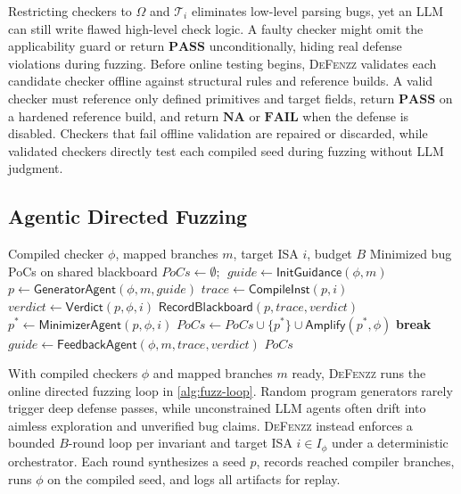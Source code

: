 \documentclass[conference,compsoc]{IEEEtran}
\begin{document}
Restricting checkers to $\Omega$ and $\mathcal{T}_i$ eliminates low-level parsing bugs, yet an LLM can still write flawed high-level check logic. A faulty checker might omit the applicability guard or return $\mathbf{PASS}$ unconditionally, hiding real defense violations during fuzzing. Before online testing begins, \textsc{DeFenzz} validates each candidate checker offline against structural rules and reference builds. A valid checker must reference only defined primitives and target fields, return $\mathbf{PASS}$ on a hardened reference build, and return $\mathbf{NA}$ or $\mathbf{FAIL}$ when the defense is disabled. Checkers that fail offline validation are repaired or discarded, while validated checkers directly test each compiled seed during fuzzing without LLM judgment.

\subsection{Agentic Directed Fuzzing}\label{sec:online}\label{sec:loop}

\begin{algorithm}[t]
\caption{Agentic Directed Fuzzing per Invariant}
\label{alg:fuzz-loop}
\footnotesize
\begin{algorithmic}[1]
\REQUIRE Compiled checker $\phi$, mapped branches $m$, target ISA $i$, budget $B$
\ENSURE Minimized bug PoCs on shared blackboard
\STATE $\textit{PoCs} \leftarrow \emptyset$; $\; \textit{guide} \leftarrow \mathsf{InitGuidance}(\phi, m)$
  \STATE $p \leftarrow \mathsf{GeneratorAgent}(\phi, m, \textit{guide})$
  \STATE $\textit{trace} \leftarrow \mathsf{CompileInst}(p, i)$
  \STATE $\textit{verdict} \leftarrow \mathsf{Verdict}(p, \phi, i)$
  \STATE $\mathsf{RecordBlackboard}(p, \textit{trace}, \textit{verdict})$
    \STATE $p^* \leftarrow \mathsf{MinimizerAgent}(p, \phi, i)$
    \STATE $\textit{PoCs} \leftarrow \textit{PoCs} \cup \{p^*\} \cup \mathsf{Amplify}(p^*, \phi)$
    \STATE \textbf{break}
  \ELSE
    \STATE $\textit{guide} \leftarrow \mathsf{FeedbackAgent}(\phi, m, \textit{trace}, \textit{verdict})$
  \ENDIF
\ENDFOR
\RETURN $\textit{PoCs}$
\end{algorithmic}
\end{algorithm}

With compiled checkers $\phi$ and mapped branches $m$ ready, \textsc{DeFenzz} runs the online directed fuzzing loop in \autoref{alg:fuzz-loop}. Random program generators rarely trigger deep defense passes, while unconstrained LLM agents often drift into aimless exploration and unverified bug claims. \textsc{DeFenzz} instead enforces a bounded $B$-round loop per invariant and target ISA $i \in I_\phi$ under a deterministic orchestrator. Each round synthesizes a seed $p$, records reached compiler branches, runs $\phi$ on the compiled seed, and logs all artifacts for replay.
\end{document}
